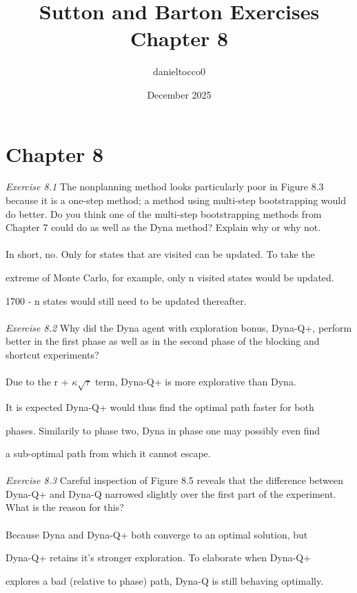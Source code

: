 \documentclass{article}
\title{Sutton and Barton Exercises Chapter 8}
\author{danieltocco0 }
\date{December 2025}
\begin{document}
\maketitle

\section{Chapter 8}
\textit{Exercise 8.1} The nonplanning method looks particularly poor in Figure 8.3 because it is
a one-step method; a method using multi-step bootstrapping would do better. Do you
think one of the multi-step bootstrapping methods from Chapter 7 could do as well as
the Dyna method? Explain why or why not.
\\
\\

In short, no. Only for states that are visited can be updated. To take the 

extreme of Monte Carlo, for example, only n visited states would be updated. 

1700 - n states would still need to be updated thereafter.
\\\\
\textit{Exercise 8.2} Why did the Dyna agent with exploration bonus, Dyna-Q+, perform
better in the first phase as well as in the second phase of the blocking and shortcut
experiments? 
\\
\\

Due to the r + $\kappa\sqrt{\tau}$ term, Dyna-Q+ is more explorative than Dyna. 

It is expected Dyna-Q+ would thus find the optimal path faster for both 

phases. Similarily to phase two, Dyna in phase one may possibly even find 

a sub-optimal path from which it cannot escape.
\\\\
\textit{Exercise 8.3} Careful inspection of Figure 8.5 reveals that the difference between Dyna-Q+
and Dyna-Q narrowed slightly over the first part of the experiment. What is the reason
for this?
\\
\\

Because Dyna and Dyna-Q+ both converge to an optimal solution, but 

Dyna-Q+ retains it's stronger exploration. To elaborate when Dyna-Q+ 

explores a bad (relative to phase) path, Dyna-Q is still behaving optimally. 
\end{document}
